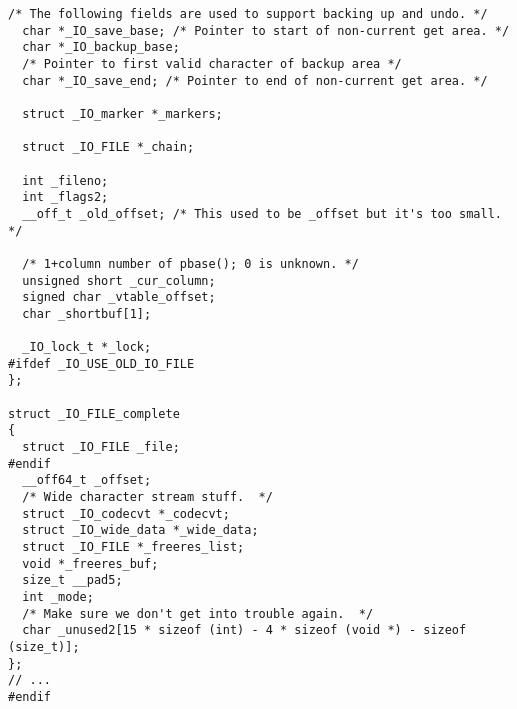 \begin{lstlisting}[caption={Структура FILE},label=lst:file]
  /* The following fields are used to support backing up and undo. */
  char *_IO_save_base; /* Pointer to start of non-current get area. */
  char *_IO_backup_base;
  /* Pointer to first valid character of backup area */
  char *_IO_save_end; /* Pointer to end of non-current get area. */

  struct _IO_marker *_markers;

  struct _IO_FILE *_chain;

  int _fileno;
  int _flags2;
  __off_t _old_offset; /* This used to be _offset but it's too small.  */

  /* 1+column number of pbase(); 0 is unknown. */
  unsigned short _cur_column;
  signed char _vtable_offset;
  char _shortbuf[1];

  _IO_lock_t *_lock;
#ifdef _IO_USE_OLD_IO_FILE
};

struct _IO_FILE_complete
{
  struct _IO_FILE _file;
#endif
  __off64_t _offset;
  /* Wide character stream stuff.  */
  struct _IO_codecvt *_codecvt;
  struct _IO_wide_data *_wide_data;
  struct _IO_FILE *_freeres_list;
  void *_freeres_buf;
  size_t __pad5;
  int _mode;
  /* Make sure we don't get into trouble again.  */
  char _unused2[15 * sizeof (int) - 4 * sizeof (void *) - sizeof (size_t)];
};
// ...
#endif
\end{lstlisting}

